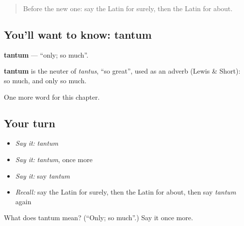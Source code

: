 \begin{quote}
Before the new one: say the Latin for surely, then the Latin for about.
\end{quote}

\subsection*{You'll want to know: tantum}
\textbf{tantum} — \textquotedblleft{}only; so much\textquotedblright{}.

\begin{cousinweb}
\textbf{tantum} is the neuter of \emph{tantus}, \textquotedblleft{}so great\textquotedblright{}, used as an adverb (Lewis \& Short): so much, and only so much.
\end{cousinweb}

\begin{grammarlens}[title={What you've built}]
One more word for this chapter.
\end{grammarlens}

\subsection*{Your turn}
\begin{itemize}
\raggedright
  \item \emph{Say it:} \emph{tantum}
  \item \emph{Say it:} \emph{tantum}, once more
  \item \emph{Say it:} say \emph{tantum}
  \item \emph{Recall:} say the Latin for surely, then the Latin for about, then say \emph{tantum} again
\end{itemize}

\begin{tcolorbox}[breakable,colback=teal!4,colframe=teal!35!black,title={Before you move on}]
What does tantum mean? (\textquotedblleft{}Only; so much\textquotedblright{}.) Say it once more.
\end{tcolorbox}
